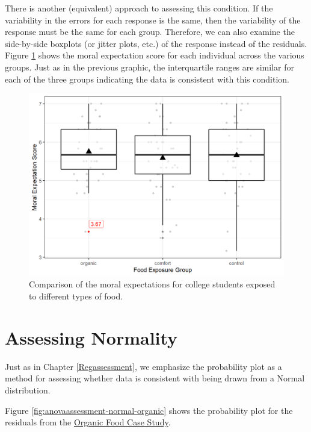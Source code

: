 \documentclass[
]{book}
\theoremstyle{plain}
\theoremstyle{mydefn}
\theoremstyle{myexmpl}
\theoremstyle{remark}
\begin{document}
There is another (equivalent) approach to assessing this condition. If the variability in the errors for each response is the same, then the variability of the response must be the same for each group. Therefore, we can also examine the side-by-side boxplots (or jitter plots, etc.) of the response instead of the residuals. Figure \ref{fig:anovaassessment-variance-organic-alt} shows the moral expectation score for each individual across the various groups. Just as in the previous graphic, the interquartile ranges are similar for each of the three groups indicating the data is consistent with this condition.

\begin{figure}

{\centering \includegraphics[width=0.8\linewidth]{./Images/anovaassessment-variance-organic-alt-1} 

}

\caption{Comparison of the moral expectations for college students exposed to different types of food.}\label{fig:anovaassessment-variance-organic-alt}
\end{figure}

\hypertarget{assessing-normality-1}{%
\section{Assessing Normality}\label{assessing-normality-1}}

Just as in Chapter \ref{Regassessment}, we emphasize the probability plot as a method for assessing whether data is consistent with being drawn from a Normal distribution.

Figure \ref{fig:anovaassessment-normal-organic} shows the probability plot for the residuals from the \protect\hyperlink{CaseOrganic}{Organic Food Case Study}.
\end{document}
